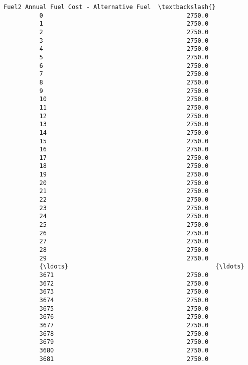 \documentclass[11pt]{article}
\begin{document}
\begin{Verbatim}[commandchars=\\\{\}]
                Fuel2 Annual Fuel Cost - Alternative Fuel  \textbackslash{}
          0                                        2750.0   
          1                                        2750.0   
          2                                        2750.0   
          3                                        2750.0   
          4                                        2750.0   
          5                                        2750.0   
          6                                        2750.0   
          7                                        2750.0   
          8                                        2750.0   
          9                                        2750.0   
          10                                       2750.0   
          11                                       2750.0   
          12                                       2750.0   
          13                                       2750.0   
          14                                       2750.0   
          15                                       2750.0   
          16                                       2750.0   
          17                                       2750.0   
          18                                       2750.0   
          19                                       2750.0   
          20                                       2750.0   
          21                                       2750.0   
          22                                       2750.0   
          23                                       2750.0   
          24                                       2750.0   
          25                                       2750.0   
          26                                       2750.0   
          27                                       2750.0   
          28                                       2750.0   
          29                                       2750.0   
          {\ldots}                                         {\ldots}   
          3671                                     2750.0   
          3672                                     2750.0   
          3673                                     2750.0   
          3674                                     2750.0   
          3675                                     2750.0   
          3676                                     2750.0   
          3677                                     2750.0   
          3678                                     2750.0   
          3679                                     2750.0   
          3680                                     2750.0   
          3681                                     2750.0   

\end{Verbatim}
\end{document}
